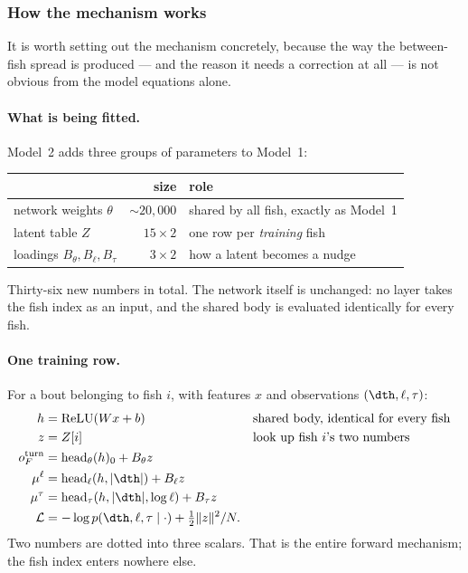 
\subsubsection{How the mechanism works}

It is worth setting out the mechanism concretely, because the way the
between-fish spread is produced --- and the reason it needs a correction at all
--- is not obvious from the model equations alone.

\paragraph{What is being fitted.} Model~2 adds three groups of parameters to
Model~1:

\begin{center}
\begin{tabular}{lrl}
\toprule
 & size & role \\
\midrule
network weights $\theta$          & ${\sim}20{,}000$ & shared by all fish, exactly as Model~1 \\
latent table $Z$                  & $15\times 2$     & one row per \emph{training} fish \\
loadings $B_\theta,B_\ell,B_\tau$ & $3\times 2$      & how a latent becomes a nudge \\
\bottomrule
\end{tabular}
\end{center}

\noindent Thirty-six new numbers in total. The network itself is unchanged: no
layer takes the fish index as an input, and the shared body is evaluated
identically for every fish.

\paragraph{One training row.} For a bout belonging to fish $i$, with features
$x$ and observations $(\dth,\ell,\tau)$:
\begin{align*}
h &= \mathrm{ReLU}(Wx+b) && \text{shared body, identical for every fish}\\
z &= Z[i] && \text{look up fish $i$'s two numbers}\\
o^{\text{turn}}_F &= \text{head}_\theta(h)_0 + B_\theta z\\
\mu^\ell &= \text{head}_\ell(h,|\dth|) + B_\ell z\\
\mu^\tau &= \text{head}_\tau(h,|\dth|,\log\ell) + B_\tau z\\
\mathcal{L} &= -\log p(\dth,\ell,\tau\mid\cdot) + \tfrac{1}{2}\lVert z\rVert^2/N .
\end{align*}
Two numbers are dotted into three scalars. That is the entire forward
mechanism; the fish index enters nowhere else.

